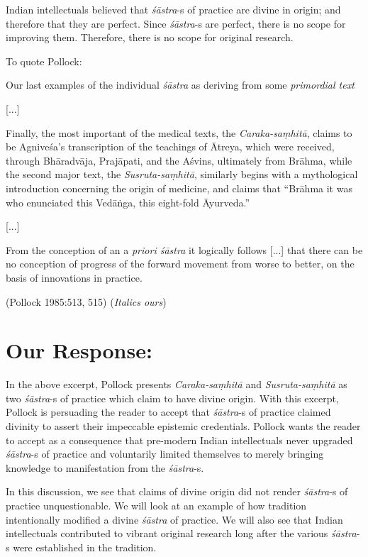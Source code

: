 Indian intellectuals believed that {{\sl śāstra}\relax}-s of practice are divine in origin; and therefore that they are perfect. Since {{\sl śāstra}\relax}-s are perfect, there is no scope for improving them. Therefore, there is no scope for original research.

To quote Pollock:
\begin{myquote}
Our last examples of the individual {\sl śāstra} as deriving from some {\sl primordial text}

[...]

Finally, the most important of the medical texts, the {\sl Caraka-saṃhitā}, claims to be Agniveśa's transcription of the teachings of Ātreya, which were received, through Bhāradvāja, Prajāpati, and the Aśvins, ultimately from Brāhma, while the second major text, the {\sl Susruta-saṃhitā}, similarly begins with a mythological introduction concerning the origin of medicine, and claims that ``Brāhma it was who enunciated this Vedāṅga, this eight-fold Āyurveda.''

[...]

\newpage

From the conception of an a {\sl priori śāstra} it logically follows [...] that there can be no conception of progress of the forward movement from worse to better, on the basis of innovations in practice. 

\hfill (Pollock 1985:513, 515) ({\sl Italics ours})
\end{myquote}

\section*{Our Response:}

In the above excerpt, Pollock presents {\sl Caraka-saṃhitā} and {\sl Susruta-saṃhitā} as two {\sl śāstra}-s of practice which claim to have divine origin.  With this excerpt, Pollock is persuading the reader to accept that {\sl śāstra}-s of practice claimed divinity to assert their impeccable epistemic credentials. Pollock wants the reader to accept as a consequence that pre-modern Indian intellectuals never upgraded {\sl śāstra}-s of practice and voluntarily limited themselves to merely bringing knowledge to manifestation from the {\sl śāstra}-s.

In this discussion, we see that claims of divine origin did not render {\sl śāstra}-s of practice unquestionable. We will look at an example of how tradition intentionally modified a divine {\sl śāstra} of practice. We will also see that Indian intellectuals contributed to vibrant original research long after the various {\sl śāstra}-s were established in the tradition.

